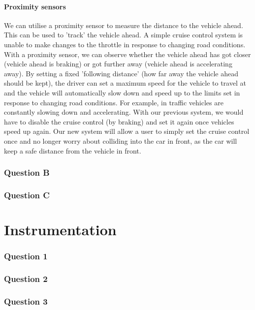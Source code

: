 \documentclass[12pt]{article}
\numberwithin{equation}{section}
\begin{document}
\subsection{Proximity sensors}
We can utilise a proximity sensor to measure the distance to the vehicle ahead. This can be used to 'track' the vehicle ahead. A simple cruise control system is unable to make changes to the throttle in response to changing road conditions. With a proximity sensor, we can observe whether the vehicle ahead has got closer (vehicle ahead is braking) or got further away (vehicle ahead is accelerating away). By setting a fixed 'following distance' (how far away the vehicle ahead should be kept), the driver can set a maximum speed for the vehicle to travel at and the vehicle will automatically slow down and speed up to the limits set in response to changing road conditions. For example, in traffic vehicles are constantly slowing down and accelerating. With our previous system, we would have to disable the cruise control (by braking) and set it again once vehicles speed up again. Our new system will allow a user to simply set the cruise control once and no longer worry about colliding into the car in front, as the car will keep a safe distance from the vehicle in front.
\section{Question B}
\section{Question C}
\part{Instrumentation}
\section{Question 1}
\section{Question 2}
\section{Question 3}
\end{document}
